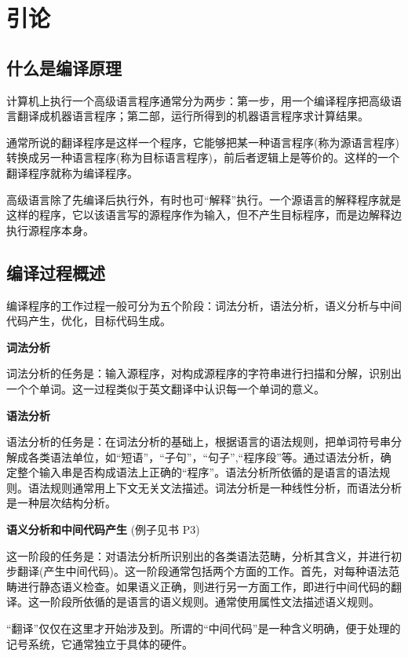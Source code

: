 \newpage
\section{引论}
\subsection{什么是编译原理}

计算机上执行一个高级语言程序通常分为两步：第一步，用一个编译程序把高级语言翻译成机器语言程序；第二部，运行所得到的机器语言程序求计算结果。

通常所说的翻译程序是这样一个程序，它能够把某一种语言程序(称为源语言程序)转换成另一种语言程序(称为目标语言程序)，前后者逻辑上是等价的。这样的一个翻译程序就称为编译程序。

高级语言除了先编译后执行外，有时也可``解释''执行。一个源语言的解释程序就是这样的程序，它以该语言写的源程序作为输入，但不产生目标程序，而是边解释边执行源程序本身。

\subsection{编译过程概述}

编译程序的工作过程一般可分为五个阶段：词法分析，语法分析，语义分析与中间代码产生，优化，目标代码生成。

\noindent\textbf{词法分析}

词法分析的任务是：输入源程序，对构成源程序的字符串进行扫描和分解，识别出一个个单词。这一过程类似于英文翻译中认识每一个单词的意义。

\noindent\textbf{语法分析}

语法分析的任务是：在词法分析的基础上，根据语言的语法规则，把单词符号串分解成各类语法单位，如``短语''，``子句''，``句子'',``程序段''等。通过语法分析，确定整个输入串是否构成语法上正确的``程序''。语法分析所依循的是语言的语法规则。语法规则通常用上下文无关文法描述。词法分析是一种线性分析，而语法分析是一种层次结构分析。

\noindent\textbf{语义分析和中间代码产生} (例子见书 P3)

这一阶段的任务是：对语法分析所识别出的各类语法范畴，分析其含义，并进行初步翻译(产生中间代码)。这一阶段通常包括两个方面的工作。首先，对每种语法范畴进行静态语义检查。如果语义正确，则进行另一方面工作，即进行中间代码的翻译。这一阶段所依循的是语言的语义规则。通常使用属性文法描述语义规则。

``翻译''仅仅在这里才开始涉及到。所谓的``中间代码''是一种含义明确，便于处理的记号系统，它通常独立于具体的硬件。

